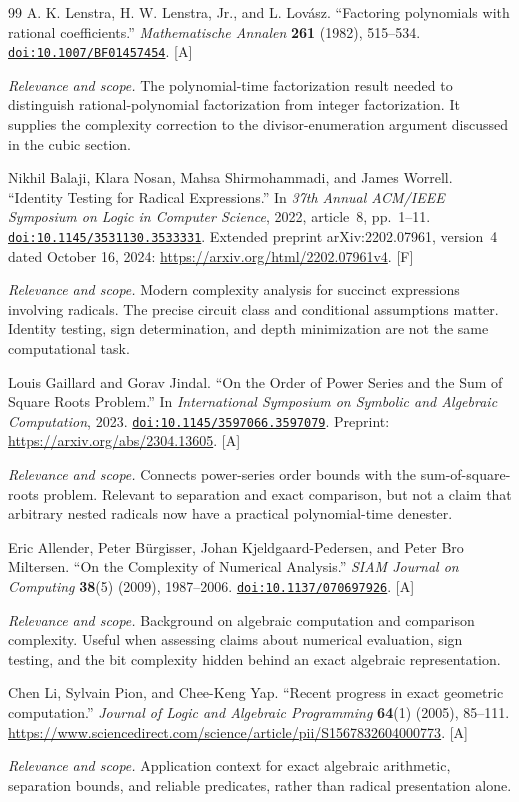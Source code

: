 \documentclass[11pt,oneside]{article}
\numberwithin{equation}{section}
\theoremstyle{definition}
\theoremstyle{remark}
\newcommand{\doi}[1]{\href{https://doi.org/#1}{\nolinkurl{doi:#1}}}
\newcommand{\status}[1]{\textsf{\small[#1]}}
\newcommand{\entrynote}[1]{\par\smallskip\noindent\emph{Relevance and scope.} #1}
\begin{document}
\begin{thebibliography}{99}
A. K. Lenstra, H. W. Lenstra, Jr., and L. Lov\'asz. ``Factoring polynomials with rational coefficients.'' \emph{Mathematische Annalen} \textbf{261} (1982), 515--534. \doi{10.1007/BF01457454}. \status{A}
\entrynote{The polynomial-time factorization result needed to distinguish rational-polynomial factorization from integer factorization. It supplies the complexity correction to the divisor-enumeration argument discussed in the cubic section.}

Nikhil Balaji, Klara Nosan, Mahsa Shirmohammadi, and James Worrell. ``Identity Testing for Radical Expressions.'' In \emph{37th Annual ACM/IEEE Symposium on Logic in Computer Science}, 2022, article~8, pp.~1--11. \doi{10.1145/3531130.3533331}. Extended preprint arXiv:2202.07961, version~4 dated October 16, 2024: \url{https://arxiv.org/html/2202.07961v4}. \status{F}
\entrynote{Modern complexity analysis for succinct expressions involving radicals. The precise circuit class and conditional assumptions matter. Identity testing, sign determination, and depth minimization are not the same computational task.}

Louis Gaillard and Gorav Jindal. ``On the Order of Power Series and the Sum of Square Roots Problem.'' In \emph{International Symposium on Symbolic and Algebraic Computation}, 2023. \doi{10.1145/3597066.3597079}. Preprint: \url{https://arxiv.org/abs/2304.13605}. \status{A}
\entrynote{Connects power-series order bounds with the sum-of-square-roots problem. Relevant to separation and exact comparison, but not a claim that arbitrary nested radicals now have a practical polynomial-time denester.}

Eric Allender, Peter B\"urgisser, Johan Kjeldgaard-Pedersen, and Peter Bro Miltersen. ``On the Complexity of Numerical Analysis.'' \emph{SIAM Journal on Computing} \textbf{38}(5) (2009), 1987--2006. \doi{10.1137/070697926}. \status{A}
\entrynote{Background on algebraic computation and comparison complexity. Useful when assessing claims about numerical evaluation, sign testing, and the bit complexity hidden behind an exact algebraic representation.}

Chen Li, Sylvain Pion, and Chee-Keng Yap. ``Recent progress in exact geometric computation.'' \emph{Journal of Logic and Algebraic Programming} \textbf{64}(1) (2005), 85--111. \url{https://www.sciencedirect.com/science/article/pii/S1567832604000773}. \status{A}
\entrynote{Application context for exact algebraic arithmetic, separation bounds, and reliable predicates, rather than radical presentation alone.}


\end{thebibliography}
\end{document}

